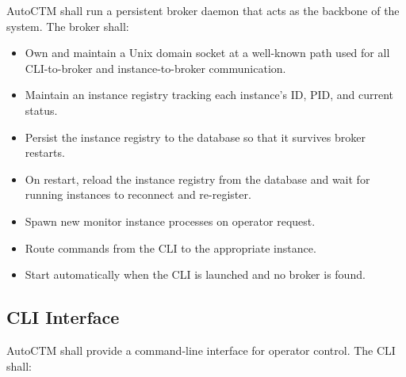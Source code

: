\documentclass{article}
\begin{document}
AutoCTM shall run a persistent broker daemon that acts as the backbone of 
the system. The broker shall:

\begin{itemize}

\item Own and maintain a Unix domain socket at a well-known path used for 
all CLI-to-broker and instance-to-broker communication.

\item Maintain an instance registry tracking each instance's ID, PID, and 
current status.

\item Persist the instance registry to the database so that it survives 
broker restarts.

\item On restart, reload the instance registry from the database and wait 
for running instances to reconnect and re-register.

\item Spawn new monitor instance processes on operator request.

\item Route commands from the CLI to the appropriate instance.

\item Start automatically when the CLI is launched and no broker is found.

\end{itemize}

\subsection{CLI Interface}

AutoCTM shall provide a command-line interface for operator control. The CLI 
shall:
\end{document}
